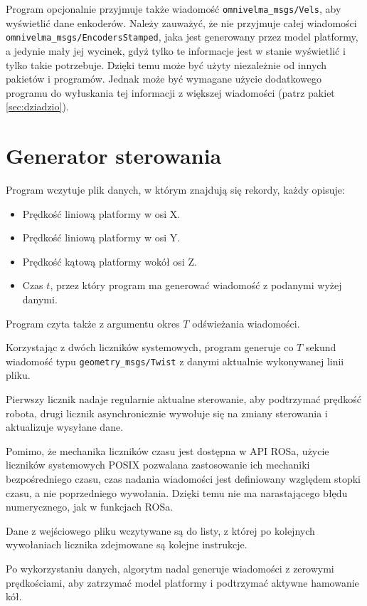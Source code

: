 		Program opcjonalnie przyjmuje także wiadomość \texttt{omnivelma\_msgs/Vels}, aby wyświetlić dane enkoderów.
		Należy zauważyć, że nie przyjmuje całej wiadomości \texttt{omnivelma\_msgs/EncodersStamped}, jaka jest generowany przez model platformy,
		a jedynie mały jej wycinek, gdyż tylko te informacje jest w stanie wyświetlić i tylko takie potrzebuje.
		Dzięki temu może być użyty niezależnie od innych pakietów i programów. Jednak może być wymagane użycie dodatkowego programu do 
		wyłuskania tej informacji z większej wiadomości (patrz pakiet \ref{sec:dziadzio}).
	
\section{Generator sterowania}
	Program wczytuje plik danych, w którym znajdują się rekordy, każdy opisuje:
	\begin{itemize}
		\item Prędkość liniową platformy w osi X.
		\item Prędkość liniową platformy w osi Y.
		\item Prędkość kątową platformy wokół osi Z.
		\item Czas $t$, przez który program ma generować wiadomość z podanymi wyżej danymi.
	\end{itemize}
	Program czyta także z argumentu okres $T$ odświeżania wiadomości.
	
	Korzystając z dwóch liczników systemowych, program generuje co $T$ sekund wiadomość typu \texttt{geometry\_msgs/Twist} z danymi aktualnie wykonywanej linii pliku.
	
	Pierwszy licznik nadaje regularnie aktualne sterowanie, aby podtrzymać prędkość robota, drugi licznik asynchronicznie wywołuje się na zmiany sterowania i aktualizuje wysyłane dane.
	
	Pomimo, że mechanika liczników czasu jest dostępna w API ROSa, użycie liczników systemowych POSIX pozwalana zastosowanie ich mechaniki bezpośredniego czasu,
	czas nadania wiadomości jest definiowany względem stopki czasu, a nie poprzedniego wywołania.
	Dzięki temu nie ma narastającego błędu numerycznego, jak w funkcjach ROSa. 
	
	Dane z wejściowego pliku wczytywane są do listy, z której po kolejnych wywołaniach licznika zdejmowane są kolejne instrukcje.
	
	Po wykorzystaniu danych, algorytm nadal generuje wiadomości z zerowymi prędkościami, aby zatrzymać model platformy i podtrzymać aktywne hamowanie kół.
	
